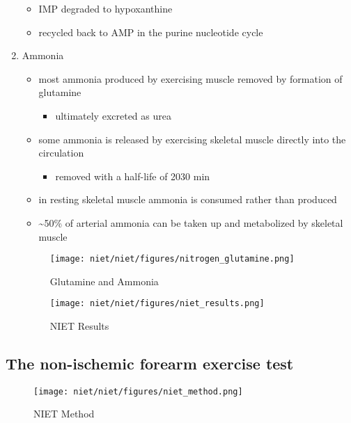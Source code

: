 \documentclass{scrartcl}
\begin{document}
\begin{enumerate}
\begin{itemize}
\item IMP degraded to hypoxanthine
\item recycled back to AMP in the purine nucleotide cycle
\end{itemize}

\item Ammonia
\label{sec:orgeef0a01}
\begin{itemize}
\item most ammonia produced by exercising muscle removed by formation of glutamine
\begin{itemize}
\item ultimately excreted as urea
\end{itemize}
\item some ammonia is released by exercising skeletal muscle directly into the circulation
\begin{itemize}
\item removed with a half-life of 20\textpm{}30 min
\end{itemize}
\item in resting skeletal muscle ammonia is consumed rather than produced
\item \textasciitilde{}50\% of arterial ammonia can be taken up and metabolized by skeletal muscle
\end{itemize}

\begin{figure}[htbp]
\centering
\texttt{[image: niet/niet/figures/nitrogen\_glutamine.png]}
\caption[gln]{\label{fig:orgacb9b2d}Glutamine and Ammonia}
\end{figure}

\begin{figure}[htbp]
\centering
\texttt{[image: niet/niet/figures/niet\_results.png]}
\caption[interp]{\label{fig:org6c658b8}NIET Results}
\end{figure}
\end{enumerate}


\subsection{The non-ischemic forearm exercise test}
\label{sec:org6160a45}

\begin{figure}[htbp]
\centering
\texttt{[image: niet/niet/figures/niet\_method.png]}
\caption{\label{fig:orgabfc229}NIET Method}
\end{figure}
\end{document}
